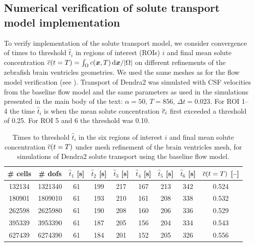 \documentclass{WileyMSP-template}
\begin{document}
\subsection{Numerical verification of solute transport model implementation}\label{subsec:numerical_verification_transport}
To verify implementation of the solute transport model, we consider
convergence of times to threshold $\hat{t}_i$ in regions of interest (ROIs)
$i$ and final mean solute concentration
$\overline{c}(t=T) = \int_{\Omega}c(\bm{x}, T) \, \mathrm d\bm{x} / \vert\Omega\vert$
on different refinements of the zebrafish brain ventricles geometries.
We used the same meshes as for the flow model verification (see ).
Transport of Dendra2 was simulated with CSF velocities
from the baseline flow model and the same parameters as used 
in the simulations presented in the main body of the text:
$\alpha=50$, $T=856$, $\Delta t=0.023$. For ROI 1--4 the time
$\hat{t}_i$ is when the mean solute concentration $\overline{c}_i$
first exceeded a threshold of 0.25. For ROI 5 and 6 the threshold
was 0.10.
\begin{table}[!htbp]
    \centering
    \small
    \caption{Times to threshold $\hat{t}_i$ in the
    six regions of interest $i$
    and final mean solute concentration $\overline{c}(t=T)$
    under mesh refinement of the brain ventricles mesh, for simulations of Dendra2
    solute transport using the baseline flow model.}
    \label{tab:ventricles_norms_adv_diff}
    \begin{tabular}{cc|ccccccc}
        \toprule
        \# cells & \# dofs &
        $\hat{t}_1$ [s] & $\hat{t}_2$ [s]& $\hat{t}_3$ [s]& $\hat{t}_4$ [s]& $\hat{t}_5$ [s]& 
        $\hat{t}_6$ [s] & $\overline{c}(t=T)$ [--] \\
        \midrule 
        132134  & 1321340  & 61 & 199 & 217 & 167 & 213 & 342 & 0.524 \\
        180901  & 1809010  & 61 & 193 & 210 & 161 & 208 & 338 & 0.532 \\
        262598  & 2625980  & 61 & 190 & 208 & 160 & 206 & 336 & 0.529 \\
        395339  & 3953390  & 61 & 187 & 205 & 156 & 204 & 334 & 0.543 \\
        627439  & 6274390  & 61 & 184 & 201 & 152 & 205 & 326 & 0.556 \\
        \bottomrule
    \end{tabular}
\end{table}
\end{document}
